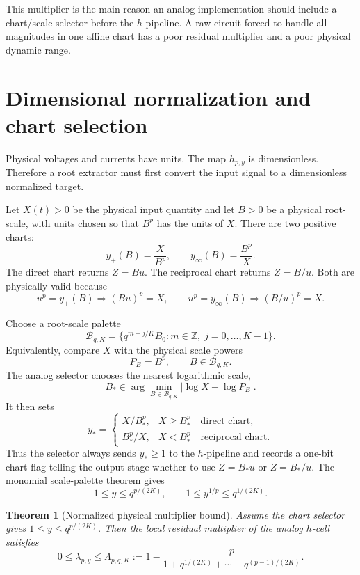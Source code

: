 \documentclass[11pt]{article}
\newtheorem{theorem}[definition]{Theorem}
\newcommand{\hp}{h_{p,y}}
\begin{document}
This multiplier is the main reason an analog implementation should include a
chart/scale selector before the \(h\)-pipeline.  A raw circuit forced to handle
all magnitudes in one affine chart has a poor residual multiplier and a poor
physical dynamic range.

\section{Dimensional normalization and chart selection}

Physical voltages and currents have units.  The map \(\hp\) is dimensionless.
Therefore a root extractor must first convert the input signal to a
dimensionless normalized target.

Let \(X(t)>0\) be the physical input quantity and let \(B>0\) be a physical
root-scale, with units chosen so that \(B^p\) has the units of \(X\).  There
are two positive charts:
\[
        y_+(B)=\frac{X}{B^p},
        \qquad
        y_\infty(B)=\frac{B^p}{X}.
\]
The direct chart returns \(Z=B u\).  The reciprocal chart returns \(Z=B/u\).
Both are physically valid because
\[
        u^p=y_+(B)\Rightarrow (Bu)^p=X,
        \qquad
        u^p=y_\infty(B)\Rightarrow (B/u)^p=X.
\]

Choose a root-scale palette
\[
        \mathcal B_{q,K}=\{q^{m+j/K}B_0:m\in\mathbb Z,\;j=0,\ldots,K-1\}.
\]
Equivalently, compare \(X\) with the physical scale powers
\[
        P_B=B^p,\qquad B\in\mathcal B_{q,K}.
\]
The analog selector chooses the nearest logarithmic scale,
\[
        B_* \in \arg\min_{B\in\mathcal B_{q,K}}
        \left|\log X-\log P_B\right|.
\]
It then sets
\[
        y_*=
        \begin{cases}
        X/B_*^p, & X\ge B_*^p \quad\text{direct chart},\\[3pt]
        B_*^p/X, & X< B_*^p \quad\text{reciprocal chart}.
        \end{cases}
\]
Thus the selector always sends \(y_*\ge1\) to the \(h\)-pipeline and records a
one-bit chart flag telling the output stage whether to use \(Z=B_*u\) or
\(Z=B_*/u\).  The monomial scale-palette theorem gives
\[
        1\le y\le q^{p/(2K)},
        \qquad
        1\le y^{1/p}\le q^{1/(2K)}.
\]

\begin{theorem}[Normalized physical multiplier bound]
Assume the chart selector gives \(1\le y\le q^{p/(2K)}\).  Then the local
residual multiplier of the analog \(h\)-cell satisfies
\[
        0\le \lambda_{p,y}\le
        \Lambda_{p,q,K}:=
        1-\frac{p}{1+q^{1/(2K)}+\cdots+q^{(p-1)/(2K)}}.
\]
\end{theorem}
\end{document}
